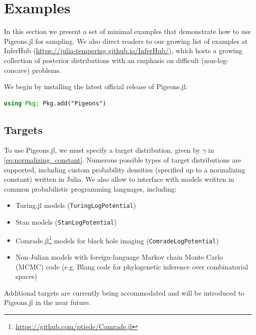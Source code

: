 \section{Examples}
In this section we present a set of minimal examples 
that demonstrate how to use Pigeons.jl for sampling. 
We also direct readers to our growing list of examples at InferHub 
(\url{https://julia-tempering.github.io/InferHub/}), which hosts a growing collection of posterior 
distributions with an emphasis on difficult (non-log-concave) problems.

\medskip
We begin by installing the latest official release of Pigeons.jl: 
\begin{lstlisting}[language = Julia]
using Pkg; Pkg.add("Pigeons")
\end{lstlisting}


\subsection{Targets}
To use Pigeons.jl, we must specify a target distribution, given by $\gamma$ 
in \cref{eq:normalizing_constant}.
Numerous possible types of target distributions are supported, including 
custom probability densities (specified up to a normalizing constant) written in Julia.
We also allow to interface with models written in common probabilistic programming 
languages, including:
\begin{itemize}
    \item Turing.jl \cite{ge2018turing} models (\texttt{TuringLogPotential})
    \item Stan \cite{carpenter2017stan} models (\texttt{StanLogPotential})
    \item Comrade.jl\footnote{\url{https://github.com/ptiede/Comrade.jl}} 
      models for black hole imaging (\texttt{ComradeLogPotential})
    \item Non-Julian models with foreign-language Markov chain Monte Carlo (MCMC) code 
    (e.g. Blang \cite{bouchard2022blang} code for phylogenetic inference over combinatorial spaces) 
\end{itemize}
Additional targets are currently being accommodated and will be 
introduced to Pigeons.jl in the near future.

